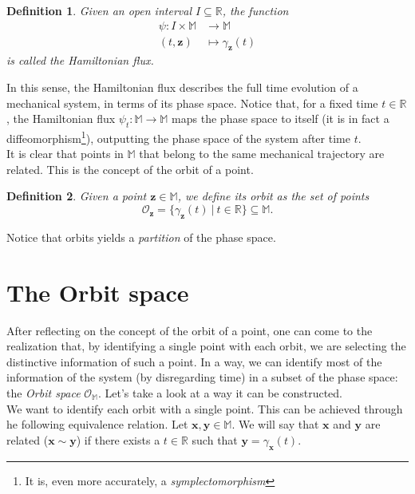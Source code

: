 \documentclass[12pt]{article}
\theoremstyle{plain}
\newtheorem{definition}{Definition}[section]
\newcommand{\R}{\mathbb{R}}
\newcommand{\M}{\mathbb{M}}
\begin{document}
\begin{definition}
    Given an open interval $I\subseteq \R$, the function 
    \begin{align*}
        \psi\colon I\times\M &\longrightarrow\M \\
        (t,\mathbf{z}) &\longmapsto \gamma_\mathbf{z}(t)
    \end{align*}
    is called the \textup{Hamiltonian flux}.
\end{definition}

In this sense, the Hamiltonian flux describes the full time evolution of a mechanical system, in terms of its phase space. Notice that, for a fixed time $t\in\R$, the Hamiltonian flux $\psi_t\colon \M\to\M$ maps the phase space to itself (it is in fact a diffeomorphism\footnote{It is, even more accurately, a \textit{symplectomorphism}}), outputting the phase space of the system after time $t$.\\

It is clear that points in $\M$ that belong to the same mechanical trajectory are related. This is the concept of the orbit of a point.

\begin{definition}
    Given a point $\mathbf{z}\in\M$, we define its \textup{orbit} as the set of points $$\mathcal{O}_\mathbf{z} = \{\gamma_\mathbf{z}(t)\ \vert\ t\in\R\}\subseteq \M.$$
\end{definition}

Notice that orbits yields a \textit{partition} of the phase space.

\section{The Orbit space}

After reflecting on the concept of the orbit of a point, one can come to the realization that, by identifying a single point with each orbit, we are selecting the distinctive information of such a point. In a way, we can identify most of the information of the system (by disregarding time) in a subset of the phase space: the \textit{Orbit space} $\mathcal{O}_\M$. Let's take a look at a way it can be constructed.\\

We want to identify each orbit with a single point. This can be achieved through he following equivalence relation. Let $\mathbf{x},\mathbf{y}\in\M$. We will say that $\mathbf{x}$ and $\mathbf{y}$ are related ($\mathbf{x}\sim\mathbf{y}$) if there exists a $t\in\R$ such that $\mathbf{y} = \gamma_\mathbf{x}(t)$.
\end{document}
